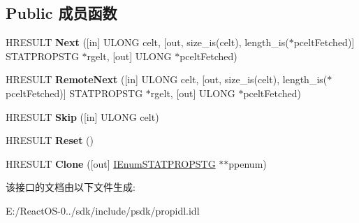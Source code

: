 \subsection*{Public 成员函数}
\begin{DoxyCompactItemize}
\item 
\mbox{\label{interface_i_enum_s_t_a_t_p_r_o_p_s_t_g_a7272f77a82a25951b00fa7e8ca913086}} 
H\+R\+E\+S\+U\+LT {\bfseries Next} (\mbox{[}in\mbox{]} U\+L\+O\+NG celt, \mbox{[}out, size\+\_\+is(celt), length\+\_\+is($\ast$pcelt\+Fetched)\mbox{]} S\+T\+A\+T\+P\+R\+O\+P\+S\+TG $\ast$rgelt, \mbox{[}out\mbox{]} U\+L\+O\+NG $\ast$pcelt\+Fetched)
\item 
\mbox{\label{interface_i_enum_s_t_a_t_p_r_o_p_s_t_g_a7a5287b11c298118d2882c8c9c4e1243}} 
H\+R\+E\+S\+U\+LT {\bfseries Remote\+Next} (\mbox{[}in\mbox{]} U\+L\+O\+NG celt, \mbox{[}out, size\+\_\+is(celt), length\+\_\+is($\ast$pcelt\+Fetched)\mbox{]} S\+T\+A\+T\+P\+R\+O\+P\+S\+TG $\ast$rgelt, \mbox{[}out\mbox{]} U\+L\+O\+NG $\ast$pcelt\+Fetched)
\item 
\mbox{\label{interface_i_enum_s_t_a_t_p_r_o_p_s_t_g_af8b53b402b06d3b4478a45957084fda8}} 
H\+R\+E\+S\+U\+LT {\bfseries Skip} (\mbox{[}in\mbox{]} U\+L\+O\+NG celt)
\item 
\mbox{\label{interface_i_enum_s_t_a_t_p_r_o_p_s_t_g_a6926a24a8652592e4a7797609aff90e6}} 
H\+R\+E\+S\+U\+LT {\bfseries Reset} ()
\item 
\mbox{\label{interface_i_enum_s_t_a_t_p_r_o_p_s_t_g_a193e069c8174eba77b6299df5f60e7b1}} 
H\+R\+E\+S\+U\+LT {\bfseries Clone} (\mbox{[}out\mbox{]} \hyperlink{interface_i_enum_s_t_a_t_p_r_o_p_s_t_g}{I\+Enum\+S\+T\+A\+T\+P\+R\+O\+P\+S\+TG} $\ast$$\ast$ppenum)
\end{DoxyCompactItemize}


该接口的文档由以下文件生成\+:\begin{DoxyCompactItemize}
\item 
E\+:/\+React\+O\+S-\/0../sdk/include/psdk/propidl.\+idl\end{DoxyCompactItemize}

